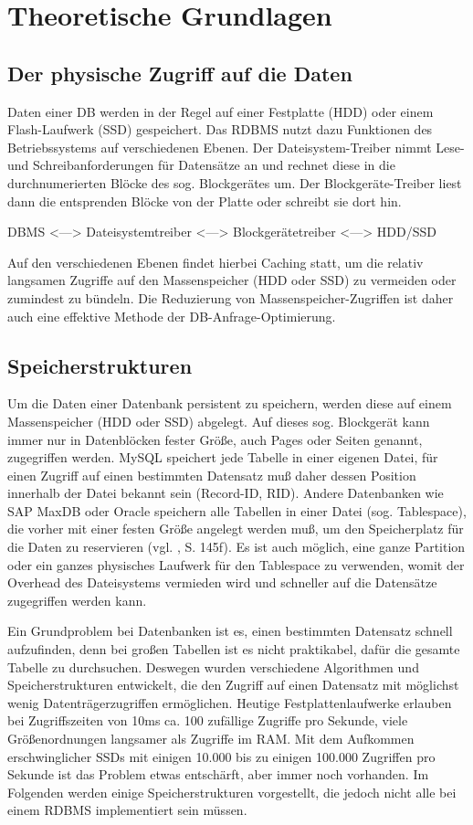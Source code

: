 \section{Theoretische Grundlagen}
\subsection{Der physische Zugriff auf die Daten}
Daten einer DB werden in der Regel auf einer Festplatte (HDD) oder einem Flash-Laufwerk (SSD) gespeichert.
Das RDBMS nutzt dazu Funktionen des Betriebssystems auf verschiedenen Ebenen.
Der Dateisystem-Treiber nimmt Lese- und Schreibanforderungen für Datensätze an und rechnet diese in die durchnumerierten Blöcke des sog. Blockgerätes um. Der Blockgeräte-Treiber liest dann die entsprenden Blöcke von der Platte oder schreibt sie dort hin.

DBMS <---> Dateisystemtreiber <---> Blockgerätetreiber <---> HDD/SSD 

Auf den verschiedenen Ebenen findet hierbei Caching statt, um die relativ langsamen Zugriffe auf den Massenspeicher (HDD oder SSD) zu vermeiden oder zumindest zu bündeln. Die Reduzierung von Massenspeicher-Zugriffen ist  daher auch eine effektive Methode der DB-Anfrage-Optimierung.

\subsection{Speicherstrukturen}
Um die Daten einer Datenbank persistent zu speichern, werden diese auf einem Massenspeicher (HDD oder SSD)  abgelegt. Auf dieses sog. Blockgerät kann immer nur in Datenblöcken fester Größe, auch Pages oder Seiten genannt, zugegriffen werden. MySQL speichert jede Tabelle in einer eigenen Datei, für einen Zugriff auf einen bestimmten Datensatz muß daher dessen Position innerhalb der Datei bekannt sein (Record-ID, RID). Andere Datenbanken wie SAP MaxDB oder Oracle speichern alle Tabellen in einer Datei (sog. Tablespace), die vorher mit einer festen Größe angelegt werden muß, um den Speicherplatz für die Daten zu reservieren (vgl. \cite{Sauer1998}, S. 145f). Es ist auch möglich, eine ganze Partition oder ein ganzes physisches Laufwerk für den Tablespace zu verwenden, womit der Overhead des Dateisystems vermieden wird und schneller auf die Datensätze zugegriffen werden kann.

Ein Grundproblem bei Datenbanken ist es, einen bestimmten Datensatz schnell aufzufinden, denn bei großen Tabellen ist es nicht praktikabel, dafür die gesamte Tabelle zu durchsuchen. Deswegen wurden verschiedene Algorithmen und Speicherstrukturen entwickelt, die den Zugriff auf einen Datensatz mit möglichst wenig Datenträgerzugriffen ermöglichen. Heutige Festplattenlaufwerke erlauben bei Zugriffszeiten von 10ms ca. 100 zufällige Zugriffe pro Sekunde, viele Größenordnungen langsamer als Zugriffe im RAM. Mit dem Aufkommen erschwinglicher SSDs mit einigen 10.000 bis zu einigen 100.000 Zugriffen pro Sekunde ist das Problem etwas entschärft, aber immer noch vorhanden. Im Folgenden werden einige Speicherstrukturen vorgestellt, die jedoch nicht alle bei einem RDBMS implementiert sein müssen.
